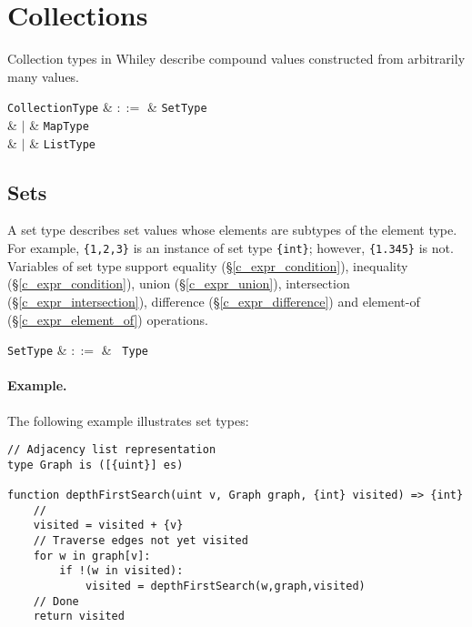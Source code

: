 
\section{Collections}
\label{c_types_collection}

Collection types in Whiley describe compound values constructed from arbitrarily many values.

\begin{syntax}
  \verb+CollectionType+ & $::=$ & \verb+SetType+\\
                        & $|$ & \verb+MapType+\\
                        & $|$ & \verb+ListType+\\
\end{syntax}



\subsection{Sets}
\label{c_types_set}

A set type describes set values whose elements are subtypes of the element type. For example, \lstinline|{1,2,3}| is an instance of set type \lstinline|{int}|; however, \lstinline|{1.345}| is not.  Variables of set type support equality (\S\ref{c_expr_condition}), inequality (\S\ref{c_expr_condition}), union (\S\ref{c_expr_union}), intersection (\S\ref{c_expr_intersection}), difference (\S\ref{c_expr_difference}) and element-of (\S\ref{c_expr_element_of}) operations.

\begin{syntax}
  \verb+SetType+ & $::=$ & \token{\{} \ \verb+Type+ \ \token{\}} \\
\end{syntax}

\paragraph{Example.} The following example illustrates set types:

\begin{lstlisting}
// Adjacency list representation
type Graph is ([{uint}] es)

function depthFirstSearch(uint v, Graph graph, {int} visited) => {int}
    //
    visited = visited + {v}
    // Traverse edges not yet visited
    for w in graph[v]:
        if !(w in visited):
            visited = depthFirstSearch(w,graph,visited)
    // Done
    return visited
\end{lstlisting}

